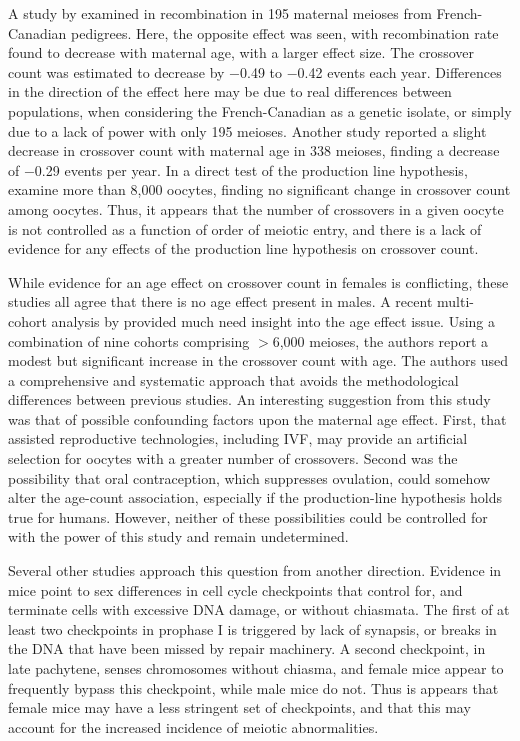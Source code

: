 A study by \citet{Hussin2011} examined in recombination in 195 maternal meioses from French-Canadian pedigrees.
Here, the opposite effect was seen, with recombination rate found to decrease with maternal age, with a larger effect size.
The crossover count was estimated to decrease by $-$0.49 to $-$0.42 events each year.
Differences in the direction of the effect here may be due to real differences between populations, when considering the French-Canadian as a genetic isolate, or simply due to a lack of power with only 195 meioses.
Another study reported a slight decrease in crossover count with maternal age in 338 meioses, finding a decrease of $-$0.29 events per year\cite{Bleazard2013}.
In a direct test of the production line hypothesis, \citet{Rowsey2014} examine more than 8,000 oocytes, finding no significant change in crossover count among oocytes.
Thus, it appears that the number of crossovers in a given oocyte is not controlled as a function of order of meiotic entry, and there is a lack of evidence for any effects of the production line hypothesis on crossover count.

While evidence for an age effect on crossover count in females is conflicting, these studies all agree that there is no age effect present in males.
A recent multi-cohort analysis by \citet{Martin2015} provided much need insight into the age effect issue.
Using a combination of nine cohorts comprising $>$6,000 meioses, the authors report a modest but significant increase in the crossover count with age.
The authors used a comprehensive and systematic approach that avoids the methodological differences between previous studies.
An interesting suggestion from this study was that of possible confounding factors upon the maternal age effect.
First, that assisted reproductive technologies, including IVF, may provide an artificial selection for oocytes with a greater number of crossovers.
Second was the possibility that oral contraception, which suppresses ovulation, could somehow alter the age-count association, especially if the production-line hypothesis holds true for humans.
However, neither of these possibilities could be controlled for with the power of this study and remain undetermined.

Several other studies approach this question from another direction.
Evidence in mice point to sex differences in cell cycle checkpoints that control for, and terminate cells with excessive DNA damage, or without chiasmata\cite{Cohen2006}.
The first of at least two checkpoints in prophase I is triggered by lack of synapsis, or breaks in the DNA that have been missed by repair machinery.
A second checkpoint, in late pachytene, senses chromosomes without chiasma, and female mice appear to frequently bypass this checkpoint, while male mice do not.
Thus is appears that female mice may have a less stringent set of checkpoints, and that this may account for the increased incidence of meiotic abnormalities\cite{Cohen2006}.

